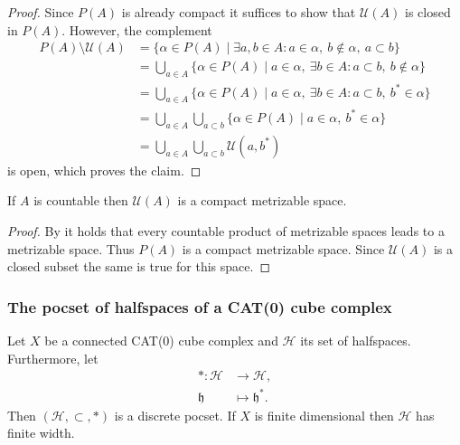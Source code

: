 \begin{proof}
  Since \(P(A)\) is already compact it suffices to show that \(\mathcal{U}(A)\) is closed in \(P(A)\). However, the complement
  \begin{align*}
    P(A) \setminus \mathcal{U}(A)
    & = \{\alpha \in P(A) \mid \exists a, b \in A\colon a \in \alpha,\ b \notin \alpha,\ a \subset b\}\\
    & = \bigcup_{a \in A} \{\alpha \in P(A) \mid a \in \alpha,\ \exists b \in A\colon a \subset b,\ b \notin \alpha\}\\
    & = \bigcup_{a \in A} \{\alpha \in P(A) \mid a \in \alpha,\ \exists b \in A\colon a \subset b,\ b^\ast \in \alpha\}\\
    & = \bigcup_{a \in A} \bigcup_{a \subset b}\{\alpha \in P(A) \mid a \in \alpha,\ b^\ast \in \alpha\}\\
    & = \bigcup_{a \in A} \bigcup_{a \subset b}\mathcal{U}(a, b^\ast)
  \end{align*}
  is open, which proves the claim.
\end{proof}

\begin{cor}
  \label{cor:comp-met-2}
  If \(A\) is countable then \(\mathcal{U}(A)\) is a compact metrizable space. 
\end{cor}

\begin{proof}
  By \textcite[Theorem~4.2.2]{Engelking} it holds that every countable product of me\-trizable spaces leads to a metrizable space. Thus \(P(A)\) is a compact metrizable space. Since \(\mathcal{U}(A)\) is a closed subset the same is true for this space.
\end{proof}


\subsubsection*{The pocset of halfspaces of a CAT(0) cube complex}
\label{pocset-halfspaces}

\begin{prop}
  \label{prop:pocset-halfspaces}
  Let \(X\) be a connected CAT(0) cube complex and \(\mathcal{H}\) its set of halfspaces. Furthermore, let
  \begin{align*}
    \ast \colon \mathcal{H} &\to \mathcal{H},\\
    \mathfrak{h} & \mapsto \mathfrak{h}^\ast.
  \end{align*}
  Then \((\mathcal{H}, \subset, \ast)\) is a discrete pocset. If \(X\) is finite dimensional then \(\mathcal{H}\) has finite width.
\end{prop}

